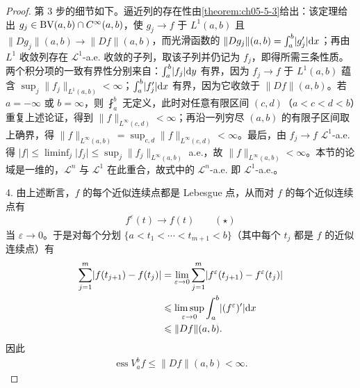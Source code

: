 \documentclass[../../main.tex]{subfiles}%
\begin{document}
\begin{proof}
第 3 步的细节如下。逼近列的存在性由\cref{theorem:ch05-5-3}给出：该定理给出 $g_j\in\mathrm{BV}(a,b)\cap C^\infty(a,b)$，使 $g_j\to f$ 于 $L^1(a,b)$ 且 $\lVert Dg_j\rVert(a,b)\to\lVert Df\rVert(a,b)$，而光滑函数的 $\lVert Dg_j\rVert(a,b)=\int_a^b\lvert g_j'\rvert\mathrm{d} x$；再由 $L^1$ 收敛列存在 $\mathcal{L}^1$-a.e. 收敛的子列，取该子列并仍记为 $f_j$，即得所需三条性质。%
两个积分项的一致有界性分别来自：$\int_a^b\lvert f_j\rvert\mathrm{d} y$ 有界，因为 $f_j\to f$ 于 $L^1(a,b)$ 蕴含 $\sup_j\lVert f_j\rVert_{L^1(a,b)}<\infty$；$\int_a^b\lvert f_j'\rvert\mathrm{d} x$ 有界，因为它收敛于 $\lVert Df\rVert(a,b)$。若 $a=-\infty$ 或 $b=\infty$，则 $\fint_a^b$ 无定义，此时对任意有限区间 $(c,d)$（$a<c<d<b$）重复上述论证，得到 $\lVert f\rVert_{L^\infty(c,d)}<\infty$；再沿一列穷尽 $(a,b)$ 的有限子区间取上确界，得 $\lVert f\rVert_{L^\infty(a,b)}=\sup_{c,d}\lVert f\rVert_{L^\infty(c,d)}<\infty$。最后，由 $f_j\to f$ $\mathcal{L}^1$-a.e. 得 $\lvert f\rvert\leqslant\liminf_j\lvert f_j\rvert\leqslant\sup_j\lVert f_j\rVert_{L^\infty(a,b)}$ a.e.，故 $\lVert f\rVert_{L^\infty(a,b)}<\infty$。本节的论域是一维的，$\mathcal{L}^n$ 与 $\mathcal{L}^1$ 在此重合，故式中的 $\mathcal{L}^n$-a.e. 即 $\mathcal{L}^1$-a.e.。

4. 由上述断言，$f$ 的每个近似连续点都是 Lebesgue 点，从而对 $f$ 的每个近似连续点有
\begin{align*}
f^\varepsilon(t)\to f(t)\qquad(\star)
\end{align*}
当 $\varepsilon\to0$。于是对每个分划 $\{a<t_1<\cdots<t_{m+1}<b\}$（其中每个 $t_j$ 都是 $f$ 的近似连续点）有
\begin{align*}
\sum_{j=1}^m\lvert f(t_{j+1})-f(t_j)\rvert&=\lim_{\varepsilon\to0}\sum_{j=1}^m\lvert f^\varepsilon(t_{j+1})-f^\varepsilon(t_j)\rvert\\
&\leqslant\limsup_{\varepsilon\to0}\int_a^b\lvert(f^\varepsilon)'\rvert\mathrm{d} x\\
&\leqslant\lVert Df\rVert(a,b).
\end{align*}
因此
\begin{align*}
\operatorname{ess}V_a^b f\leqslant\lVert Df\rVert(a,b)<\infty .
\end{align*}
\end{proof}
\end{document}
